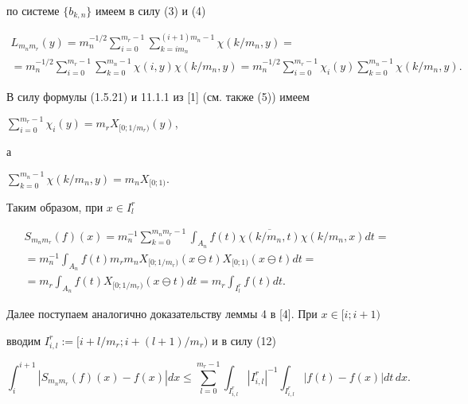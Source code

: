 по системе $\{b_{k,n}\}$ имеем в силу (3) и (4)


\begin{multline*}


L_{m_nm_r}(y)=m_n^{-1/2}\sum^{m_r-1}_{i=0}


\sum^{(i+1)m_n-1}_{k=im_n}\chi(k/m_n,y)=\\


%


=m_n^{-1/2}\sum_{i=0}^{m_r-1}\sum^{m_n-1}_{k=0}\chi(i,y)\chi(k/m_n,y)=


m_n^{-1/2}\sum^{m_r-1}_{i=0}\chi_i(y)\sum^{m_n-1}_{k=0}\chi(k/m_n,y).


\end{multline*}


В силу формулы (1.5.21) и 11.1.1 из [1] (см. также (5)) имеем 


$\sum\limits_{i=0}^{m_r-1}\chi_i(y)=m_rX_{[0;1/m_r)}(y)$,


а


$\sum\limits^{m_n-1}_{k=0}\chi(k/m_n,y)=m_nX_{[0;1)}$.


Таким образом, при $x\in I^r_l$


\begin{multline}


S_{m_nm_r}(f)(x)=m_n^{-1}\sum^{m_nm_r-1}_{k=0}


\int_{A_n}f(t)\overline{\chi(k/m_n,t)}\chi(k/m_n,x)dt=\\


%


=m_n^{-1}\int_{A_n}f(t)m_rm_nX_{[0;1/m_r)}(x\ominus t)


X_{[0;1)}(x\ominus t)dt=\\


% 


=m_r\int_{A_n}f(t)X_{[0;1/m_r)}(x\ominus t)dt=


m_r\int_{I^r_l}f(t)dt.


\end{multline}


Далее поступаем аналогично доказательству леммы 4 в [4]. При $x\in [i;i+1)$ 


вводим $I^r_{i,l}:=[i+l/m_r;i+(l+1)/m_r)$ и в силу (12)


$$


\int^{i+1}_i|S_{m_nm_r}(f)(x)-f(x)|dx\leq


\sum^{m_r-1}_{l=0}


\int_{I^r_{i,l}}|I^r_{i,l}|^{-1}\int_{I^r_{i,l}}|f(t)-f(x)|dt\,dx.


$$


